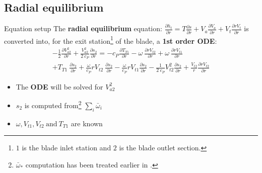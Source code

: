 \subsection{Radial equilibrium}
	\begin{frame}{Equation setup}
		The \textbf{radial equilibrium} equation: $\frac{\partial h_t}{\partial r} = T \frac{\partial s}{\partial r} + V_a \frac{\partial V_a}{\partial r} + V_t \frac{\partial r V_t}{\partial r}$ is converted into, for the exit station\footnote{$1$ is the blade inlet station and $2$ is the blade outlet section.} of the blade, a \textbf{1st order ODE}:
		\begin{equation}
			\begin{split}
				- \frac{1}{2} \frac{\partial V_{a2}^2}{\partial r} + \frac{V_{a2}^2}{2 \ c_P} \frac{\partial s_{2}}{\partial r} = - c_P \frac{\partial T_{T1}}{\partial r} - \omega \ \frac{\partial r V_{t2}}{\partial r} + \omega \ \frac{\partial r V_{t1}}{\partial r} \\ + T_{T1} \ \frac{\partial s_2}{\partial r} + \frac{\omega}{c_P} r V_{t2} \ \frac{\partial s_2}{\partial r} - \frac{\omega}{c_P} r V_{t1} \frac{\partial s_2}{\partial r} - \frac{1}{2 \ c_P} V_{t2}^2 \frac{\partial s_2}{\partial r} + \frac{V_{t2}}{r} \frac{\partial r V_{t2}}{\partial r}	
			\nonumber
			\end{split}
		\end{equation}
		\begin{itemize}
			\item The \textbf{ODE} will be solved for $V_{a2}^2$ 
			\item $s_2$ is computed from\footnote{$\bar{\omega}_{*}$ computation has been treated earlier in \hyperlink{lossesModeling}{{\color{blue} }}.} $\sum_i \bar{\omega}_{i}$
			\item $\omega, V_{t1}, V_{t2} \ \text{and} \ T_{T1}$ are known
		\end{itemize}
	\end{frame}
	
